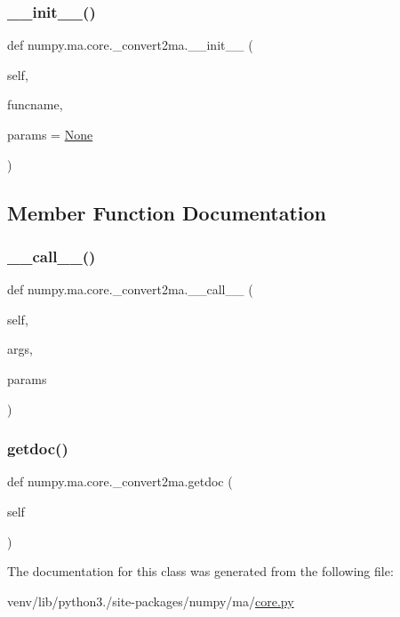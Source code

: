 \subsubsection{\texorpdfstring{\+\_\+\+\_\+init\+\_\+\+\_\+()}{\_\_init\_\_()}}
{\footnotesize\ttfamily def numpy.\+ma.\+core.\+\_\+convert2ma.\+\_\+\+\_\+init\+\_\+\+\_\+ (\begin{DoxyParamCaption}\item[{}]{self,  }\item[{}]{funcname,  }\item[{}]{params = {\ttfamily \hyperlink{namespacenumpy_1_1ma_1_1core_a647ee1848dfa3692fe35a663a2aa40b3}{None}} }\end{DoxyParamCaption})}



\subsection{Member Function Documentation}
\mbox{\label{classnumpy_1_1ma_1_1core_1_1__convert2ma_a8014ec006e1596e593ac5ca51e51564b}} 
\subsubsection{\texorpdfstring{\+\_\+\+\_\+call\+\_\+\+\_\+()}{\_\_call\_\_()}}
{\footnotesize\ttfamily def numpy.\+ma.\+core.\+\_\+convert2ma.\+\_\+\+\_\+call\+\_\+\+\_\+ (\begin{DoxyParamCaption}\item[{}]{self,  }\item[{}]{args,  }\item[{}]{params }\end{DoxyParamCaption})}

\mbox{\label{classnumpy_1_1ma_1_1core_1_1__convert2ma_a6b1c1592ccd65f6fe1ac2a9c8409fea0}} 
\subsubsection{\texorpdfstring{getdoc()}{getdoc()}}
{\footnotesize\ttfamily def numpy.\+ma.\+core.\+\_\+convert2ma.\+getdoc (\begin{DoxyParamCaption}\item[{}]{self }\end{DoxyParamCaption})}



The documentation for this class was generated from the following file\+:\begin{DoxyCompactItemize}
\item 
venv/lib/python3./site-\/packages/numpy/ma/\hyperlink{numpy_2ma_2core_8py}{core.\+py}\end{DoxyCompactItemize}
